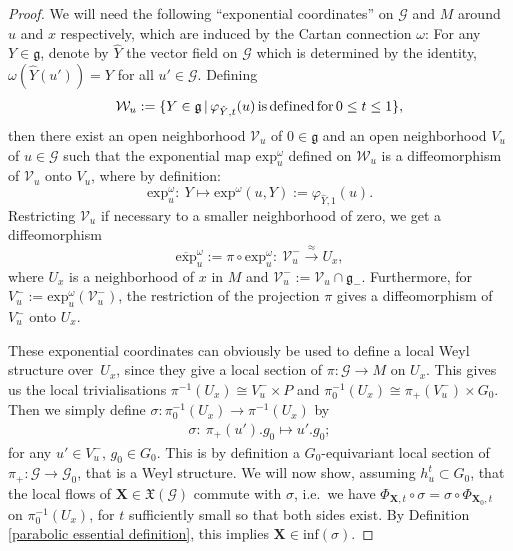 \documentclass[pdftex]{sigma}
\def\g{\mathfrak{g}}
\def\Gbdle{\mathcal{G}}
\def\VF{\mathfrak{X}}
\def\isom{\cong}
\theoremstyle{plain}
\theoremstyle{definition}
\begin{document}
\begin{proof} We will need the following ``exponential coordinates'' on $\Gbdle$ and $M$ around $u$ and $x$ respectively, which are induced by the Cartan connection $\omega$: For any $Y \in \g$, denote by $\hat{Y}$ the vector f\/ield on $\Gbdle$ which is determined by the identity, $\omega(\hat{Y}(u')) = Y$ for all $u' \in \Gbdle$. Def\/ining
\[
\mathcal{W}_u := \{ Y \in \g \, \vert \, \varphi_{\hat{Y},t}(u) \, \mathrm{is} \, \mathrm{def\/ined} \, \mathrm{for} \, 0 \leq t \leq 1 \},
\]
then there exist an open neighborhood $\mathcal{V}_u$ of $0 \in \g$ and an open neighborhood $V_u$ of $u \in \Gbdle$ such that the exponential map $\mathrm{exp}_u^{\omega}$ def\/ined on $\mathcal{W}_u$ is a dif\/feomorphism of $\mathcal{V}_u$ onto $V_u$, where by def\/inition:
\[
\mathrm{exp}_u^{\omega}: \  Y \mapsto \mathrm{exp}^{\omega}(u,Y) := \varphi_{\hat{Y},1}(u).
\]
Restricting $\mathcal{V}_u$ if necessary to a smaller neighborhood of zero, we get a dif\/feomorphism
\[
\overline{\mathrm{exp}}_u^{\omega} := \pi \circ \mathrm{exp}_u^{\omega}: \ \mathcal{V}_u^- \stackrel{\approx}{\rightarrow} U_x,
\]
where $U_x$ is a neighborhood of $x$ in $M$ and $\mathcal{V}_u^- := \mathcal{V}_u \cap \g_-$. Furthermore, for $V_u^- := \mathrm{exp}^{\omega}_u(\mathcal{V}_u^-)$, the restriction of the projection $\pi$ gives a dif\/feomorphism of $V_u^-$ onto $U_x$.

These exponential coordinates can obviously be used to def\/ine a local Weyl structure over~$U_x$, since they give a local section of $\pi: \Gbdle \rightarrow M$ on $U_x$. This gives us the local trivialisations $\pi^{-1}(U_x) \isom V_u^- \times P$ and $\pi_0^{-1}(U_x) \isom \pi_+(V_u^-) \times G_0$. Then we simply def\/ine $\sigma: \pi_0^{-1}(U_x) \rightarrow \pi^{-1}(U_x)$ by
\begin{gather}
\sigma: \ \pi_+(u').g_0 \mapsto u'.g_0; \label{exponential Weyl structure}
\end{gather}
for any $u' \in V_u^-$, $g_0 \in G_0$. This is by def\/inition a $G_0$-equivariant local section of $\pi_+: \Gbdle \rightarrow \Gbdle_0$, that is a Weyl structure. We will now show, assuming $h_u^t \subset G_0$, that the local f\/lows of $\mathbf{X} \in \VF(\Gbdle)$ commute with $\sigma$, i.e.\ we have $\Phi_{\mathbf{X},t} \circ \sigma = \sigma \circ \Phi_{\mathbf{X}_0,t}$ on $\pi_0^{-1}(U_x)$, for $t$ suf\/f\/iciently small so that both sides exist. By Def\/inition \ref{parabolic essential definition}, this implies $\mathbf{X} \in \mathrm{inf}(\sigma)$.


\end{proof}
\end{document}
